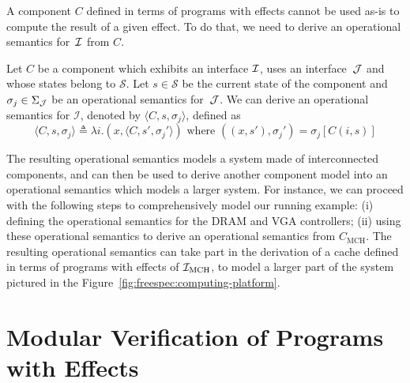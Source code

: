 A component $C$ defined in terms of programs with effects cannot be used as-is
to compute the result of a given effect.
%
To do that, we need to derive an operational semantics for~$\mathcal{I}$ from $C$.

\begin{definition} \label{def:freespec:derivation}
  Let $C$ be a component which exhibits an interface $\mathcal{I}$, uses an
  interface~$\mathcal{J}$ and whose states belong to $\mathcal{S}$.
  Let $s \in \mathcal{S}$ be the current state of the component and $\sigma_j
  \in \Sigma_{\mathcal{J}}$ be an operational semantics for~$\mathcal{J}$.
  We can derive an operational semantics for $\mathcal{I}$, denoted by $\langle
  C, s, \sigma_j \rangle$, defined as
  \[ \langle C, s, \sigma_j \rangle \triangleq \lambda i. (x, \langle C, s',
    \sigma_j' \rangle) \text{ where } ((x, s'), \sigma_j') = \sigma_j[C (i, s)]
  \]
\end{definition}

%
The resulting operational semantics models a system made of
interconnected components, and can then be used to derive another
component model into an operational semantics which models a larger system.
%
For instance, we can proceed with the following steps to comprehensively model
our running example: (i) defining the operational semantics for the DRAM and VGA
controllers; (ii) using these operational semantics to derive an operational
semantics from $C_{\mathrm{MCH}}$.
%
The resulting operational semantics can take part in the derivation of a
cache defined in terms of programs with effects of $\mathcal{I}_{\mathrm{MCH}}$, to
model a larger part of the system pictured in the
Figure~\ref{fig:freespec:computing-platform}.

\section{Modular Verification of Programs with Effects}
\label{sec:freespec:verifying}

